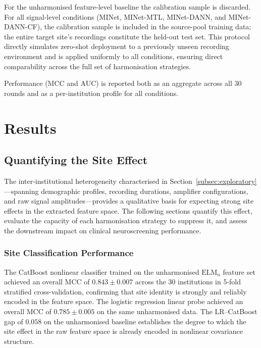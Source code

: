 \documentclass[preprint,12pt]{elsarticle}
\begin{document}
For the unharmonised feature-level baseline
the calibration sample is discarded.
For all signal-level conditions (MINet, MINet-MTL, MINet-DANN, and
MINet-DANN-CF), the calibration sample is included in the source-pool
training data; the entire target site's recordings constitute the
held-out test set.
This protocol directly simulates zero-shot deployment to a previously
unseen recording environment and is applied uniformly to all
conditions, ensuring direct comparability across the full set of
harmonisation strategies.

Performance (MCC and AUC) is reported both as an aggregate across
all 30 rounds and as a per-institution profile for all conditions.

\section{Results}
\label{sec:results}


\subsection{Quantifying the Site Effect}
\label{subsec:site_classification}
The inter-institutional heterogeneity characterised in
Section~\ref{subsec:exploratory}---spanning demographic profiles,
recording durations, amplifier configurations, and raw signal
amplitudes---provides a qualitative basis for expecting strong
site effects in the extracted feature space.
The following sections quantify this effect, evaluate the capacity
of each harmonisation strategy to suppress it, and assess the
downstream impact on clinical neuroscreening performance.
\subsubsection{Site Classification Performance}

The CatBoost nonlinear classifier trained on the unharmonised
$\mathrm{ELM}_n$ feature set achieved an overall MCC of
$0.843 \pm 0.007$ across the 30 institutions in 5-fold stratified
cross-validation, confirming that site identity is strongly and
reliably encoded in the feature space.
The logistic regression linear probe achieved an overall MCC of
$0.785 \pm 0.005$ on the same unharmonised data.
The LR--CatBoost gap of $0.058$ on the unharmonised baseline
establishes the degree to which the site effect in the raw feature
space is already encoded in nonlinear covariance structure.
\end{document}
